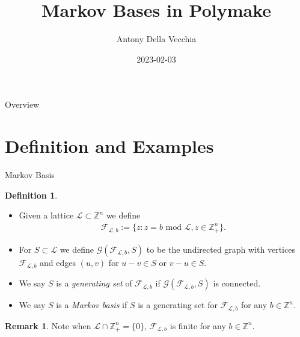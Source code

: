 \documentclass[9pt]{beamer}
\author{Antony Della Vecchia}
\title{Markov Bases in Polymake}
\institute[]{
Technische Universit\"at Berlin
}
\date{
2023-02-03
}
\newcommand\set[1]{\{#1\}}
\newcommand\Z{\mathbb{Z}}
\theoremstyle{definition}
\newtheorem{remark}{Remark}
\newtheorem{defn}{Definition}
\begin{document}
\maketitle
\begin{frame}[fragile]{Overview}
  \begin{tcolorbox}
    \tableofcontents
  \end{tcolorbox}
\end{frame}

\section{Definition and Examples}

\begin{frame}[fragile]{Markov Basis}
  \begin{defn}
    \begin{itemize}
      \item Given a lattice $\mathcal{L}  \subset \Z^n$ we define
        \begin{align*}
          \mathcal{F}_{\mathcal{L}, b} := \set{z : z = b \text{ mod } \mathcal{L} , z \in \Z^n_+}.
        \end{align*}
      \item For $S \subset \mathcal{L}$ we define
        $\mathcal{G}(\mathcal{F}_{\mathcal{L}, b}, S)$ to be the undirected graph with vertices
        $\mathcal{F}_{\mathcal{L}, b}$ and edges $(u,v)$ for $u - v \in S$ or $v - u \in S$.
      \item We say $S$ is a \emph{generating set} of $\mathcal{F}_{\mathcal{L}, b}$ if
        $\mathcal{G}(\mathcal{F}_{\mathcal{L}, b}, S)$ is connected.
      \item We say $S$ is a \emph{Markov basis} if $S$ is a generating set for $\mathcal{F}_{\mathcal{L}, b}$ for any $b \in \Z^n$.
    \end{itemize}
  \end{defn}
  \begin{remark}
    Note when $\mathcal{L} \cap \Z^n_+ = \set{0}$, $\mathcal{F}_{\mathcal{L}, b}$ is finite for any $b \in \Z^n$.
  \end{remark}
\end{frame}
\end{document}

